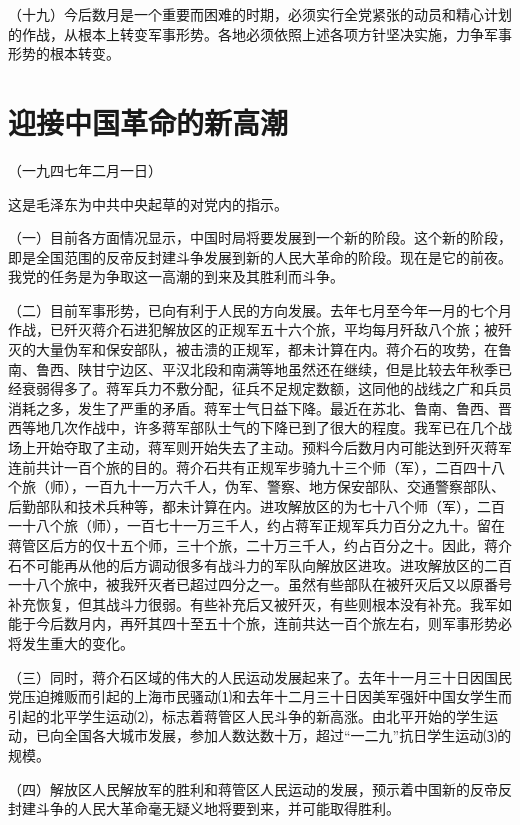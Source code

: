 \documentclass[UTF-8, a5paper, 12pt]{ctexart}
\begin{document}
（十九）今后数月是一个重要而困难的时期，必须实行全党紧张的动员和精心计划的作战，从根本上转变军事形势。各地必须依照上述各项方针坚决实施，力争军事形势的根本转变。

\section{迎接中国革命的新高潮}


（一九四七年二月一日）

这是毛泽东为中共中央起草的对党内的指示。

（一）目前各方面情况显示，中国时局将要发展到一个新的阶段。这个新的阶段，即是全国范围的反帝反封建斗争发展到新的人民大革命的阶段。现在是它的前夜。我党的任务是为争取这一高潮的到来及其胜利而斗争。

（二）目前军事形势，已向有利于人民的方向发展。去年七月至今年一月的七个月作战，已歼灭蒋介石进犯解放区的正规军五十六个旅，平均每月歼敌八个旅；被歼灭的大量伪军和保安部队，被击溃的正规军，都未计算在内。蒋介石的攻势，在鲁南、鲁西、陕甘宁边区、平汉北段和南满等地虽然还在继续，但是比较去年秋季已经衰弱得多了。蒋军兵力不敷分配，征兵不足规定数额，这同他的战线之广和兵员消耗之多，发生了严重的矛盾。蒋军士气日益下降。最近在苏北、鲁南、鲁西、晋西等地几次作战中，许多蒋军部队士气的下降已到了很大的程度。我军已在几个战场上开始夺取了主动，蒋军则开始失去了主动。预料今后数月内可能达到歼灭蒋军连前共计一百个旅的目的。蒋介石共有正规军步骑九十三个师（军），二百四十八个旅（师），一百九十一万六千人，伪军、警察、地方保安部队、交通警察部队、后勤部队和技术兵种等，都未计算在内。进攻解放区的为七十八个师（军），二百一十八个旅（师），一百七十一万三千人，约占蒋军正规军兵力百分之九十。留在蒋管区后方的仅十五个师，三十个旅，二十万三千人，约占百分之十。因此，蒋介石不可能再从他的后方调动很多有战斗力的军队向解放区进攻。进攻解放区的二百一十八个旅中，被我歼灭者已超过四分之一。虽然有些部队在被歼灭后又以原番号补充恢复，但其战斗力很弱。有些补充后又被歼灭，有些则根本没有补充。我军如能于今后数月内，再歼其四十至五十个旅，连前共达一百个旅左右，则军事形势必将发生重大的变化。

（三）同时，蒋介石区域的伟大的人民运动发展起来了。去年十一月三十日因国民党压迫摊贩而引起的上海市民骚动⑴和去年十二月三十日因美军强奸中国女学生而引起的北平学生运动⑵，标志着蒋管区人民斗争的新高涨。由北平开始的学生运动，已向全国各大城市发展，参加人数达数十万，超过“一二九”抗日学生运动⑶的规模。

（四）解放区人民解放军的胜利和蒋管区人民运动的发展，预示着中国新的反帝反封建斗争的人民大革命毫无疑义地将要到来，并可能取得胜利。
\end{document}
